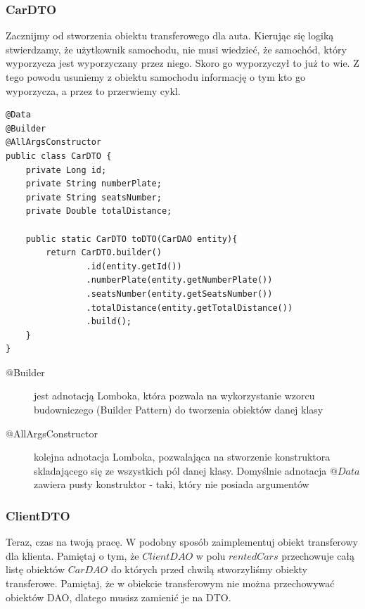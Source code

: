 \documentclass{article}
\begin{document}
            \subsubsection{CarDTO}
                Zacznijmy od stworzenia obiektu transferowego dla auta. Kierując się logiką stwierdzamy, że użytkownik samochodu, nie musi wiedzieć, że samochód, który wyporzycza jest wyporzyczany przez niego. Skoro go wyporzyczył to już to wie. Z tego powodu usuniemy z obiektu samochodu informację o tym kto go wyporzycza, a przez to przerwiemy cykl.
                \begin{verbatim}
@Data
@Builder
@AllArgsConstructor
public class CarDTO {
    private Long id;
    private String numberPlate;
    private String seatsNumber;
    private Double totalDistance;

    public static CarDTO toDTO(CarDAO entity){
        return CarDTO.builder()
                .id(entity.getId())
                .numberPlate(entity.getNumberPlate())
                .seatsNumber(entity.getSeatsNumber())
                .totalDistance(entity.getTotalDistance())
                .build();
    }
}
                \end{verbatim}
                \begin{description}
                    \item[@Builder] jest adnotacją Lomboka, która pozwala na wykorzystanie wzorcu budowniczego (Builder Pattern) do tworzenia obiektów danej klasy
                    \item[@AllArgsConstructor] kolejna adnotacja Lomboka, pozwalająca na stworzenie konstruktora skladającego się ze wszystkich pól danej klasy. Domyślnie adnotacja $@Data$ zawiera pusty konstruktor - taki, który nie posiada argumentów
                \end{description}
            \subsubsection{ClientDTO}
                Teraz, czas na twoją pracę. W podobny sposób zaimplementuj obiekt transferowy dla klienta. Pamiętaj o tym, że  $ClientDAO$ w polu $rentedCars$ przechowuje całą listę obiektów $CarDAO$ do których przed chwilą stworzyliśmy obiekty transferowe. Pamiętaj, że w obiekcie transferowym nie można przechowywać obiektów DAO, dlatego musisz zamienić je na DTO.
                
\end{document}
